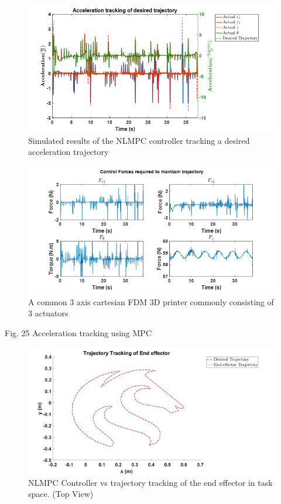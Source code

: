 \documentclass{UoNMCHA}
\numberwithin{equation}{section}
\begin{document}
	
	\begin{figure}[H]
		\begin{center}
			\includegraphics[width=.8\linewidth]{figs/Picture35}
			\caption{Simulated results of the NLMPC controller tracking a desired acceleration trajectory}
			\label{figs/Picture35}
		\end{center}
	\end{figure}
	

	
	\begin{figure}[H]
		\begin{center}
			\includegraphics[width=.8\linewidth]{figs/Picture36}
			\caption{A  common 3 axis cartesian FDM 3D printer commonly consisting of 3 actuators}
			\label{figs/Picture36}
		\end{center}
	\end{figure}
	
	Fig. 25 Acceleration tracking using MPC
	
	\begin{figure}[H]
		\begin{center}
			\includegraphics[width=.8\linewidth]{figs/Picture391}
			\caption{NLMPC Controller vs trajectory tracking of the end effector in task space. (Top View)}
			\label{figs/Picture381}
		\end{center}
	\end{figure}
	
\end{document}
